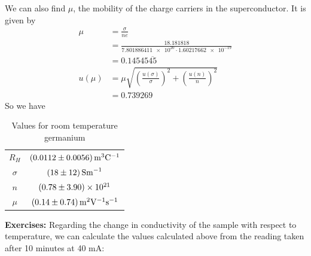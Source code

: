 \documentclass[12pt]{article}
\numberwithin{equation}{section}
\numberwithin{figure}{section}
\numberwithin{table}{section}
\begin{document}
    We can also find $\mu$, the mobility of the charge carriers in the superconductor. It is 
    given by 
    \begin{align*}
        \mu&=\frac{\sigma}{ne}\\
        &=\frac{18.181818}{\num{7.801886411e20}\cdot\num{1.60217662e-19}}\\
        &=0.14545\overline{45}\\
        u(\mu)&=\mu\sqrt{\left(\frac{u(\sigma)}{\sigma}\right)^2+\left(\frac{u(n)}{n}\right)^2}\\
        &=0.739269
    \end{align*}
    So we have
    \begin{table}[H]
        \centering
        \begin{tabular}{c|c}
            $R_H$ & $\SI{0.0112\pm0.0056}{\metre^3 \coulomb^{-1}}$ \\
            $\sigma$ & $\SI{18\pm12}{\siemens\metre^{-1}}$\\
            $n$ & $\num{0.78\pm3.9e21}$\\
            $\mu$ & $\SI{0.14\pm0.74}{\metre^2\volt^{-1}\second^{-1}}$
        \end{tabular}
        \caption{Values for room temperature germanium}
        \label{tbl:Room Temp}
    \end{table}
    \textbf{Exercises:}
    Regarding the change in conductivity of the sample with respect to temperature, we can 
    calculate the values calculated above from the reading taken after 10 minutes at 40 mA:
\end{document}
